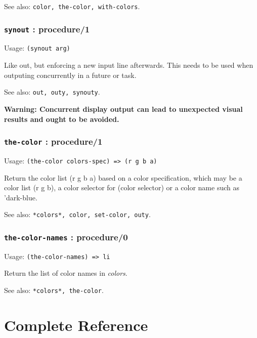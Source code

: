 \documentclass[
]{article}
\newcommand{\passthrough}[1]{#1}
\begin{document}
See also: \passthrough{\lstinline!color, the-color, with-colors!}.

\hypertarget{synout-procedure1}{%
\subsubsection{\texorpdfstring{\texttt{synout} :
procedure/1}{synout : procedure/1}}\label{synout-procedure1}}

Usage: \passthrough{\lstinline!(synout arg)!}

Like out, but enforcing a new input line afterwards. This needs to be
used when outputing concurrently in a future or task.

See also: \passthrough{\lstinline!out, outy, synouty!}.

\textbf{Warning: Concurrent display output can lead to unexpected visual
results and ought to be avoided.}

\hypertarget{the-color-procedure1}{%
\subsubsection{\texorpdfstring{\texttt{the-color} :
procedure/1}{the-color : procedure/1}}\label{the-color-procedure1}}

Usage: \passthrough{\lstinline!(the-color colors-spec) => (r g b a)!}

Return the color list (r g b a) based on a color specification, which
may be a color list (r g b), a color selector for (color selector) or a
color name such as 'dark-blue.

See also: \passthrough{\lstinline!*colors*, color, set-color, outy!}.

\hypertarget{the-color-names-procedure0}{%
\subsubsection{\texorpdfstring{\texttt{the-color-names} :
procedure/0}{the-color-names : procedure/0}}\label{the-color-names-procedure0}}

Usage: \passthrough{\lstinline!(the-color-names) => li!}

Return the list of color names in \emph{colors}.

See also: \passthrough{\lstinline!*colors*, the-color!}.

\hypertarget{complete-reference}{%
\section{Complete Reference}\label{complete-reference}}
\end{document}
